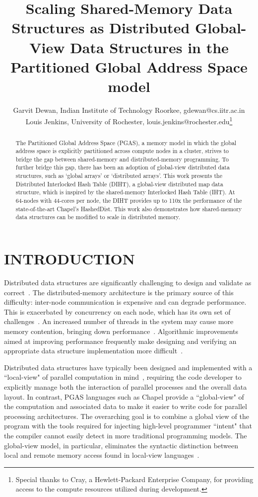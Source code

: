 \documentclass[letterpaper, 10 pt, conference]{ieeeconf}  %
\title{\LARGE \bf
Scaling Shared-Memory Data Structures as Distributed Global-View Data Structures in the Partitioned Global Address Space model}
\author{Garvit Dewan, Indian Institute of Technology Roorkee, gdewan@cs.iitr.ac.in \\ Louis Jenkins, University of Rochester, louis.jenkins@rochester.edu\thanks{Special thanks to Cray, a Hewlett-Packard Enterprise Company, for providing access to the compute resources utilized during development.}}
\begin{document}
\maketitle
\thispagestyle{empty}
\pagestyle{empty}


\begin{abstract}


The Partitioned Global Address Space (PGAS), a memory model in which the global address space is explicitly partitioned across compute nodes in a cluster, strives to bridge the gap between shared-memory and distributed-memory programming. To further bridge this gap, there has been an adoption of global-view distributed data structures, such as `global arrays' or `distributed arrays’. This work presents the Distributed Interlocked Hash Table (DIHT), a global-view distributed map data structure, which is inspired by the shared-memory Interlocked Hash Table (IHT).
At 64-nodes with 44-cores per node, the DIHT provides up to 110x the performance of the state-of-the-art Chapel's HashedDist. This work also demonstrates how shared-memory data structures can be modified to scale in distributed memory.  

\end{abstract}


\section{INTRODUCTION}



Distributed data structures are significantly challenging to design and validate as correct~\cite{kshemkalyani2011distributed}. The distributed-memory architecture is the primary source of this difficulty: inter-node communication is expensive and can degrade performance. This is exacerbated by concurrency on each node, which has its own set of challenges~\cite{mAlgorithmsScalableSynchronization1991}. An increased number of threads in the system may cause more memory contention, bringing down performance~\cite{robison2007too}. Algorithmic improvements aimed at improving performance frequently make designing and verifying an appropriate data structure implementation more difficult~\cite{gramoli}.

Distributed data structures have typically been designed and implemented with a ``local-view" of parallel computation in mind~\cite{barrett2008exploring}, requiring the code developer to explicitly manage both the interaction of parallel processes and the overall data layout. In contrast, PGAS languages such as Chapel provide a ``global-view" of the computation and associated data to make it easier to write code for parallel processing architectures. 
The overarching goal is to combine a global view of the program with the tools required for injecting high-level programmer ``intent" that the compiler cannot easily detect in more traditional programming models. 
The global-view model, in particular, eliminates the syntactic distinction between local and remote memory access found in local-view languages~\cite{hayashiLLVMbasedCommunicationOptimizations2015}. 
\end{document}
